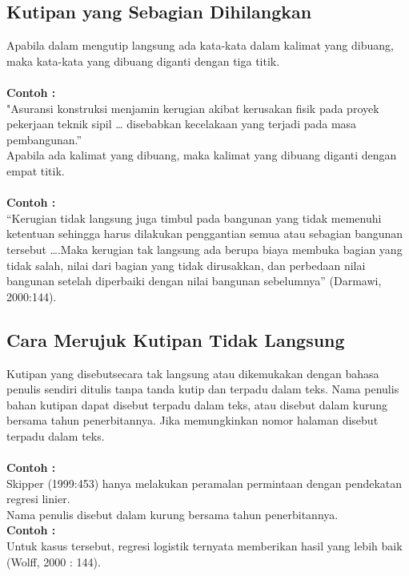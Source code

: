 \subsection{Kutipan	yang	Sebagian	Dihilangkan}
Apabila	 dalam	 mengutip	 langsung	 ada	 kata-kata	 dalam	 kalimat	 yang	 dibuang,	 maka	kata-kata	yang	dibuang	diganti	dengan	tiga	titik. \\
\\

\textbf{Contoh :}\\
"Asuransi	konstruksi	menjamin	kerugian	akibat	kerusakan	fisik	pada	proyek	pekerjaan	teknik	sipil	…	disebabkan	kecelakaan	yang	terjadi	pada	masa	pembangunan.” \\

Apabila	ada	 kalimat	 yang	 	 dibuang,	maka	 kalimat	 yang	 dibuang	 diganti	 dengan	empat	titik.\\
\\

\textbf{Contoh :}\\
“Kerugian	 tidak	langsung	juga	 timbul	pada	bangunan	 yang	 tidak	memenuhi	 ketentuan	sehingga	harus	dilakukan penggantian	semua	atau	sebagian	bangunan	tersebut	….Maka	kerugian	 tak	 langsung	 ada	 berupa	 biaya	 membuka	 bagian	 yang	 tidak	 salah,	 nilai	 dari	bagian	yang	tidak	dirusakkan,	dan	perbedaan	nilai	bangunan	setelah	diperbaiki	dengan	nilai	bangunan	sebelumnya”	(Darmawi,	2000:144).

\subsection{Cara	Merujuk	Kutipan	Tidak	Langsung}
Kutipan	 yang	 disebutsecara	 tak	 langsung	 atau	 dikemukakan	 dengan	 bahasa	 penulis	 sendiri	ditulis	tanpa	tanda	kutip	dan	terpadu	dalam	teks.	Nama	penulis	bahan	kutipan	dapat	disebut	terpadu	 dalam	 teks,	 atau	 disebut	 dalam	 kurung	 bersama	 tahun	 penerbitannya.	 Jika	memungkinkan	nomor	halaman	disebut	terpadu	dalam	teks.
\\
\\
\textbf{Contoh :} \\
Skipper	 (1999:453)	 hanya	 melakukan	 peramalan	 permintaan	 dengan	 pendekatan	 regresi	linier.\\ Nama	penulis	disebut	dalam	kurung	bersama	tahun	penerbitannya.\\
\textbf{Contoh :}\\
Untuk	kasus	tersebut,	regresi	logistik	ternyata	memberikan	hasil	yang	lebih	baik	(Wolff,	2000	
:	144).

